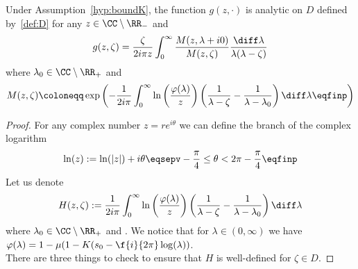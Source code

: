 \begin{theorem}
Under Assumption~\ref{hyp:boundK}, the function $g(z, \cdot)$ is analytic on $D$ defined by~\eqref{def:D} for any $z \in \CC \setminus \RR_-$ and
\begin{align*}
    g(z,\zeta) 
    &= 
    \frac{\zeta}{2i\pi z}\int_0^\infty  \frac{M(z,\lambda+i0)}{M(z,\zeta)} \frac{\diff \lambda}{\lambda(\lambda-\zeta)} \\
\end{align*}
where $\lambda_0 \in \CC \setminus \RR_+$ and 
$$ M(z, \zeta) \coloneqq \exp\left(-{\frac{1}{2i\pi  }\int_0^\infty \ln\left(\frac{\varphi(\lambda)}{z}\right) \left( \frac{1}{\lambda-\zeta} - \frac{1}{\lambda-\lambda_0}\right) \diff \lambda} \eqfinp\right)$$ 
\end{theorem}
\begin{proof}

For any complex number $z = re^{i\theta}$ we can define the branch of the complex logarithm
\begin{equation}\label{def:log}
\ln(z) := \ln(|z|) + i\theta \eqsepv -\frac{\pi}{4} \leq \theta < 2\pi - \frac{\pi}{4}  \eqfinp
\end{equation}
Let us denote
    \begin{align}\label{def:H}
        H(z,\zeta) := \frac{1}{2i\pi }\int_0^\infty \ln\left(\frac{\varphi(\lambda)}{z}\right) \left( \frac{1}{\lambda-\zeta} - \frac{1}{\lambda-\lambda_0}\right) \diff \lambda
    \end{align}
where $\lambda_0 \in \CC \setminus \RR_+$ and . We notice that for $\lambda \in (0,\infty)$ we have $\varphi(\lambda)=1-\mu(1-K(s_0-\f{i}{2\pi} \log(\lambda))$.\\

There are three things to check to ensure that $H$ is well-defined for $\zeta \in D$. 


\end{proof}
